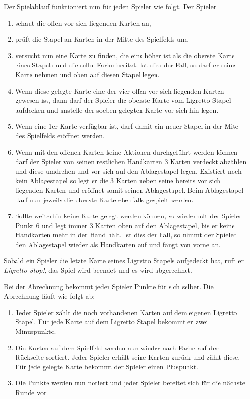Der Spielablauf funktioniert nun für jeden Spieler wie folgt. Der Spieler
\begin{enumerate}
\item schaut die offen vor sich liegenden Karten an,
\item prüft die Stapel an Karten in der Mitte des Spielfelds und
\item versucht nun eine Karte zu finden, die eins höher ist als die oberste Karte eines Stapels und die selbe Farbe besitzt. Ist dies der Fall, so darf er seine Karte nehmen und oben auf diesen Stapel legen.
\item Wenn diese gelegte Karte eine der vier offen vor sich liegenden Karten gewesen ist, dann darf der Spieler die oberste Karte vom Ligretto Stapel aufdecken und anstelle der soeben gelegten Karte vor sich hin legen.
\item Wenn eine 1er Karte verfügbar ist, darf damit ein neuer Stapel in der Mite des Spielfelds eröffnet werden.
\item Wenn mit den offenen Karten keine Aktionen durchgeführt werden können darf der Spieler von seinen restlichen Handkarten 3 Karten verdeckt abzählen und diese umdrehen und vor sich auf den Ablagestapel legen. Existiert noch kein Ablagestapel so legt er die 3 Karten neben seine bereits vor sich liegenden Karten und eröffnet somit seinen Ablagestapel. Beim Ablagestapel darf nun jeweils die oberste Karte ebenfalls gespielt werden.
\item Sollte weiterhin keine Karte gelegt werden können, so wiederholt der Spieler Punkt 6 und legt immer 3 Karten oben auf den Ablagestapel, bis er keine Handkarten mehr in der Hand hält. Ist dies der Fall, so nimmt der Spieler den Ablagestapel wieder als Handkarten auf und fängt von vorne an.
\end{enumerate}

Sobald ein Spieler die letzte Karte seines Ligretto Stapels aufgedeckt hat, ruft er \textit{Ligretto Stop!}, das Spiel wird beendet und es wird abgerechnet.

Bei der Abrechnung bekommt jeder Spieler Punkte für sich selber. Die Abrechnung läuft wie folgt ab:
\begin{enumerate}
	\item Jeder Spieler zählt die noch vorhandenen Karten auf dem eigenen Ligretto Stapel. Für jede Karte auf dem Ligretto Stapel bekommt er zwei Minuspunkte.
	\item Die Karten auf dem Spielfeld werden nun wieder nach Farbe auf der Rückseite sortiert. Jeder Spieler erhält seine Karten zurück und zählt diese. Für jede gelegte Karte bekommt der Spieler einen Pluspunkt.
	\item Die Punkte werden nun notiert und  jeder Spieler bereitet sich für die nächste Runde vor.
\end{enumerate}